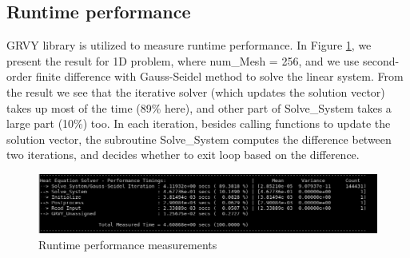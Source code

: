 \documentclass{article}
\begin{document}
\subsection{Runtime performance}
GRVY library is utilized to measure runtime performance. In Figure \ref{fig:timing}, we present the result
for 1D problem, where num\_Mesh = 256, and we use second-order finite difference with Gauss-Seidel method
to solve the linear system. From the result we see that the iterative solver (which updates the solution
vector) takes up most of the time (89\% here), and other part of Solve\_System takes a large part (10\%) too.
In each iteration, besides calling functions to update the solution vector, the subroutine Solve\_System
computes the difference between two iterations, and decides whether to exit loop based on the difference.

\begin{figure}[h]
    \centering
    \includegraphics[width=\textwidth]{timing.png}
    \caption{Runtime performance measurements}
    \label{fig:timing}
\end{figure}
\end{document}
